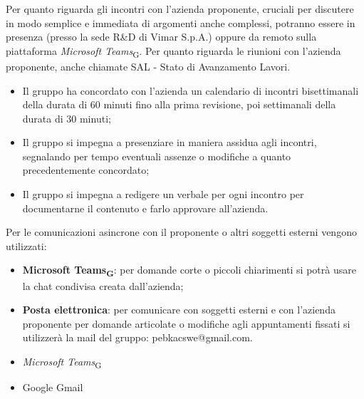 Per quanto riguarda gli incontri con l'azienda proponente, cruciali per discutere in modo semplice e immediata di argomenti anche complessi, potranno essere in presenza (presso la sede R\&D di Vimar S.p.A.) oppure da remoto sulla piattaforma \textit{Microsoft Teams}\textsubscript{G}. Per quanto riguarda le riunioni con l'azienda proponente, anche chiamate SAL - Stato di Avanzamento Lavori.
\begin{itemize}
    \item Il gruppo ha concordato con l'azienda un calendario di incontri bisettimanali della durata di 60 minuti fino alla prima revisione, poi settimanali della durata di 30 minuti;
    \item Il gruppo si impegna a presenziare in maniera assidua agli incontri, segnalando per tempo eventuali assenze o modifiche a quanto precedentemente concordato;
    \item Il gruppo si impegna a redigere un verbale per ogni incontro per documentarne il contenuto e farlo approvare all'azienda. 
\end{itemize}
Per le comunicazioni asincrone con il proponente o altri soggetti esterni vengono utilizzati:
\begin{itemize}
    \item \textbf{Microsoft Teams\textsubscript{G}}: per domande corte o piccoli chiarimenti si potrà usare la chat condivisa creata dall'azienda;
    \item \textbf{Posta elettronica}: per comunicare con soggetti esterni e con l'azienda proponente per domande articolate o modifiche agli appuntamenti fissati si utilizzerà la mail del gruppo: pebkacswe@gmail.com.
\end{itemize}
\begin{itemize}
    \item \textit{Microsoft Teams}\textsubscript{G}
    \item Google Gmail
\end{itemize}


